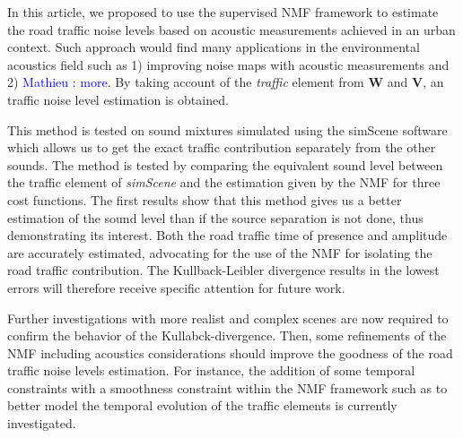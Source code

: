\documentclass{article}
\newcommand{\ml}[1]{\textcolor{blue}{ Mathieu : #1}}
\begin{document}
\begin{sloppy}
In this article, we proposed to use the supervised NMF framework to estimate the road traffic noise levels based on acoustic measurements achieved in an urban context. Such approach would find many applications in the environmental acoustics field such as 1) improving noise maps with acoustic measurements and 2) \ml{more}. By taking account of the \textit{traffic} element from $\mathbf{W}$ and $\mathbf{V}$, an traffic noise level estimation is obtained.

This method is tested on sound mixtures simulated using the simScene software which allows us to get the exact traffic contribution separately from the other sounds. The method is tested by comparing the equivalent sound level between the traffic element of \textit{simScene} and the estimation given by the NMF for three cost functions. The first results show that this method gives us a better estimation of the sound level than if the source separation is not done, thus demonstrating its interest. Both the road traffic time of presence and amplitude are accurately estimated, advocating for the use of the NMF for isolating the road traffic contribution. The Kullback-Leibler divergence results in the lowest errors will therefore receive specific attention for future work. 

Further investigations with more realist and complex scenes are now required to confirm the behavior of the Kullabck-divergence. Then, some refinements of the NMF including acoustics considerations should improve the goodness of the road traffic noise levels estimation. For instance, the addition of some temporal constraints with a smoothness constraint within the NMF framework such as \cite{fevotteSmooth} \cite{Essid} \cite{virtanenSmooth} to better model the temporal evolution of the traffic elements is currently investigated.






\end{sloppy}
\end{document}
